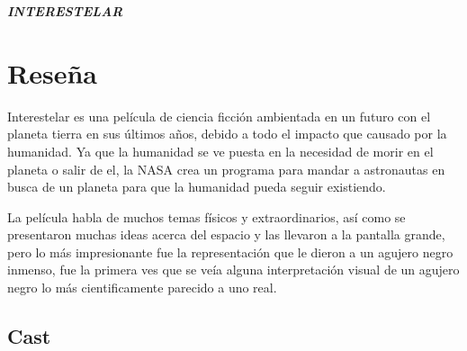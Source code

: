 \documentclass[a4paper, 11pt]{article}
\begin{document}
\begin{center}
\textit{\textbf{\huge{INTERESTELAR}}}    
\end{center}




 \section{Reseña}

 Interestelar es una película de ciencia ficción ambientada en un futuro con el planeta tierra en sus últimos años, debido a todo el impacto que causado por la humanidad. Ya que la humanidad se ve puesta en la necesidad de morir en el planeta o salir de el, la NASA crea un programa para mandar a astronautas en busca de un planeta para que la humanidad pueda seguir existiendo.
 
 La película habla de muchos temas físicos y extraordinarios, así como se presentaron muchas ideas acerca del espacio y las llevaron a la pantalla grande, pero lo más impresionante fue la representación que le dieron a un agujero negro inmenso, fue la primera ves que se veía alguna interpretación visual de un agujero negro lo más cientificamente parecido a uno real.

 \subsection{Cast}
\end{document}
